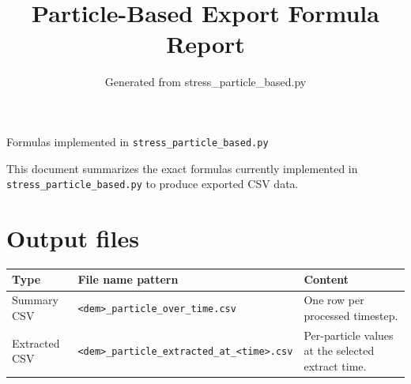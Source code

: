 \documentclass[11pt,a4paper]{article}
\title{Particle-Based Export Formula Report}
\author{Generated from stress\_particle\_based.py}
\date{}
\newcommand{\code}[1]{\begingroup\urlstyle{tt}\footnotesize\nolinkurl{#1}\endgroup}
\begin{document}
\maketitle
\noindent Formulas implemented in \code{stress_particle_based.py}\par
\medskip
\noindent This document summarizes the exact formulas currently implemented in \code{stress_particle_based.py} to produce exported CSV data.

\section*{Output files}
\begin{longtable}{@{}L{0.18\textwidth}L{0.32\textwidth}L{0.42\textwidth}@{}}
\toprule
\textbf{Type} & \textbf{File name pattern} & \textbf{Content}\\
\midrule
\endhead
Summary CSV & \code{<dem>_particle_over_time.csv} & One row per processed timestep.\\
Extracted CSV & \code{<dem>_particle_extracted_at_<time>.csv} & Per-particle values at the selected extract time.\\
\bottomrule
\end{longtable}
\end{document}
